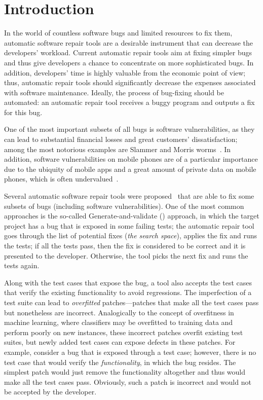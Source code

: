 \section{Introduction}

In the world of countless software bugs and limited resources to fix them, automatic software repair tools are a desirable instrument that can decrease the developers' workload.
Current automatic repair tools aim at fixing simpler bugs and thus give developers a chance to concentrate on more sophisticated bugs.
In addition, developers' time is highly valuable from the economic point of view; thus, automatic repair tools should significantly decrease the expenses  associated with software maintenance.
Ideally, the process of bug-fixing should be automated: an automatic repair tool receives a buggy program and outputs a fix for this bug.

One of the most important subsets of all bugs is software vulnerabilities, as they can lead to substantial financial losses and great customers' dissatisfaction; among the most notorious examples are Slammer and Morris worms~\cite{moore2003inside, streak2003morris}.
In addition, software vulnerabilities on mobile phones are of a particular importance due to the ubiquity of mobile apps and a great amount of private data on mobile phones, which is often undervalued~\cite{egelman2014you}.

Several automatic software repair tools were proposed~\cite{le2012systematic, long2015staged, mechtaev2016angelix} that are able to fix some subsets of bugs (including software vulnerabilities).
One of the most common approaches is the so-called Generate-and-validate (\GV) approach, in which the target project has a bug that is exposed in some failing tests; the automatic repair tool goes through the list of potential fixes (\emph{the search space}), applies the fix and runs the tests; if all the tests pass, then the fix is considered to be correct and it is presented to the developer.
Otherwise, the tool picks the next fix and runs the tests again.

Along with the test cases that expose the bug, a \GV tool also accepts the test cases that verify the existing functionality to avoid regressions.
The imperfection of a test suite can lead to \emph{overfitted} patches---patches that make all the test cases pass but nonetheless are incorrect.
Analogically to the concept of overfitness in machine learning, where classifiers may be overfitted to training data and perform poorly on new instances, these incorrect patches overfit existing test suites, but newly added test cases can expose defects in these patches.
For example, consider a bug that is exposed through a test case; however, there is no test case that would verify the \emph{functionality}, in which the bug resides.
The simplest patch would just remove the functionality altogether and thus would make all the test cases pass.
Obviously, such a patch is incorrect and would not be accepted by the developer.

